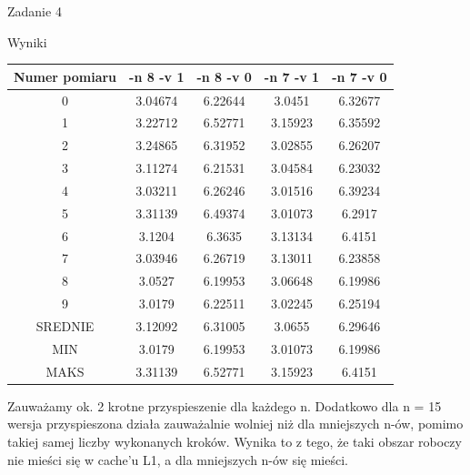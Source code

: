 \documentclass[11pt,wide]{mwart}
\begin{document}
\begin{section}{Zadanie 4}
\begin{subsection}{Wyniki}
\begin{center}
\begin{tabular}{|c|c|c|c|c|}
\hline
Numer pomiaru &  -n 8 -v 1 & -n 8 -v 0 & -n 7 -v 1 & -n 7 -v 0 \\
\hline
0 & 3.04674 & 6.22644 & 3.0451 & 6.32677\\
\hline
1 & 3.22712 & 6.52771 & 3.15923 & 6.35592\\
\hline
2 & 3.24865 & 6.31952 & 3.02855 & 6.26207\\
\hline
3 & 3.11274 & 6.21531 & 3.04584 & 6.23032\\
\hline
4 & 3.03211 & 6.26246 & 3.01516 & 6.39234\\
\hline
5 & 3.31139 & 6.49374 & 3.01073 & 6.2917\\
\hline
6 & 3.1204 & 6.3635 & 3.13134 & 6.4151\\
\hline
7 & 3.03946 & 6.26719 & 3.13011 & 6.23858\\
\hline
8 & 3.0527 & 6.19953 & 3.06648 & 6.19986\\
\hline
9 & 3.0179 & 6.22511 & 3.02245 & 6.25194\\
\hline
SREDNIE & 3.12092 & 6.31005 & 3.0655 & 6.29646\\
\hline
MIN & 3.0179 & 6.19953 & 3.01073 & 6.19986\\
\hline
MAKS & 3.31139 & 6.52771 & 3.15923 & 6.4151\\
\hline
\end{tabular}
\end{center}
Zauważamy ok. 2 krotne przyspieszenie dla każdego n. Dodatkowo dla n = 15 wersja przyspieszona działa zauważalnie wolniej niż dla mniejszych n-ów, pomimo takiej samej liczby wykonanych kroków. Wynika to z tego, że taki obszar roboczy nie mieści się w cache'u L1, a dla mniejszych n-ów się mieści.
\end{subsection}

\end{section}
\end{document}
